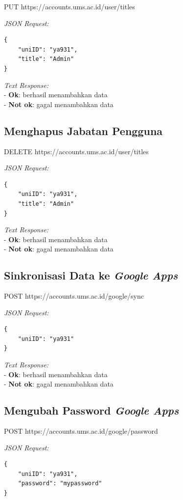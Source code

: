 PUT https://accounts.ums.ac.id/user/titles

\noindent
\textit{JSON Request:}
\begin{lstlisting}
{
    "uniID": "ya931",
    "title": "Admin"
}
\end{lstlisting}

\noindent
\textit{Text Response:}\\
- \textbf{Ok}: berhasil menambahkan data\\
-  \textbf{Not ok}: gagal menambahkan data

\subsection{Menghapus Jabatan Pengguna}

DELETE https://accounts.ums.ac.id/user/titles

\noindent
\textit{JSON Request:}
\begin{lstlisting}
{
    "uniID": "ya931",
    "title": "Admin"
}
\end{lstlisting}

\noindent
\textit{Text Response:}\\
- \textbf{Ok}: berhasil menambahkan data\\
-  \textbf{Not ok}: gagal menambahkan data

\subsection{Sinkronisasi Data ke \textit{Google Apps}}

POST https://accounts.ums.ac.id/google/sync

\noindent
\textit{JSON Request:}
\begin{lstlisting}
{
    "uniID": "ya931"
}
\end{lstlisting}

\noindent
\textit{Text Response:}\\
- \textbf{Ok}: berhasil menambahkan data\\
-  \textbf{Not ok}: gagal menambahkan data

\subsection{Mengubah Password \textit{Google Apps}}

POST https://accounts.ums.ac.id/google/password

\noindent
\textit{JSON Request:}
\begin{lstlisting}
{
    "uniID": "ya931",
    "password": "mypassword"
}
\end{lstlisting}

